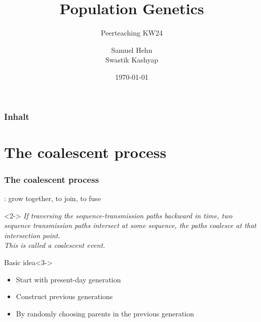 \documentclass{beamer}
\title{Population Genetics}
\subtitle{Peerteaching KW24}
\author{Samuel Hehn \\ Swastik Kashyap}
\institute{Universität Tübingen}
\date{\today}
\begin{document}
    {
    \begin{frame}
        \titlepage
    \end{frame}
    }

    {
    \begin{frame}
        \frametitle{Inhalt}
        \tableofcontents
    \end{frame}
    }

    \section{The coalescent process}

        \begin{frame}
            \frametitle{The coalescent process}
            : grow together, to join, to fuse

            \begin{definition}<2->
                \textit{
                    If traversing the sequence-transmission paths backward in time,
                    two sequence transmission paths intersect at some sequence,
                    the paths coalesce at that intersection point. \\
                    This is called a coalescent event.
                }
            \end{definition}
        
            \begin{block}{Basic idea}<3->
                \begin{itemize}
                    \item<4-> Start with present-day generation
                    \item<5-> Construct previous generations
                    \item<6-> By randomly choosing parents in the previous generation
                \end{itemize}
            \end{block}
        \end{frame}
\end{document}
